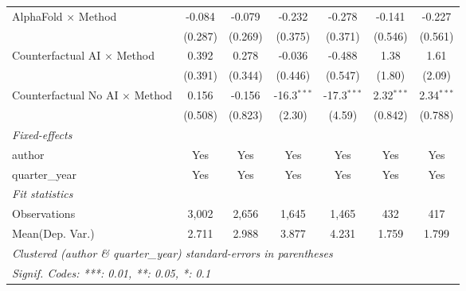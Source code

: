 \begin{tabular}{lcccccc}
   AlphaFold $\times$ Method             & -0.084        & -0.079        & -0.232        & -0.278        & -0.141       & -0.227\\   
                                         & (0.287)       & (0.269)       & (0.375)       & (0.371)       & (0.546)      & (0.561)\\   
   Counterfactual AI $\times$ Method     & 0.392         & 0.278         & -0.036        & -0.488        & 1.38         & 1.61\\   
                                         & (0.391)       & (0.344)       & (0.446)       & (0.547)       & (1.80)       & (2.09)\\   
   Counterfactual No AI $\times$ Method  & 0.156         & -0.156        & -16.3$^{***}$ & -17.3$^{***}$ & 2.32$^{***}$ & 2.34$^{***}$\\   
                                         & (0.508)       & (0.823)       & (2.30)        & (4.59)        & (0.842)      & (0.788)\\   
   \midrule
   \emph{Fixed-effects}\\
   author                                & Yes           & Yes           & Yes           & Yes           & Yes          & Yes\\  
   quarter\_year                         & Yes           & Yes           & Yes           & Yes           & Yes          & Yes\\  
   \midrule
   \emph{Fit statistics}\\
   Observations                          & 3,002         & 2,656         & 1,645         & 1,465         & 432          & 417\\  
Mean(Dep. Var.) & 2.711 & 2.988 & 3.877 & 4.231 & 1.759 & 1.799 \\
   \midrule \midrule
   \multicolumn{7}{l}{\emph{Clustered (author \& quarter\_year) standard-errors in parentheses}}\\
   \multicolumn{7}{l}{\emph{Signif. Codes: ***: 0.01, **: 0.05, *: 0.1}}\\
\end{tabular}
\par\endgroup
